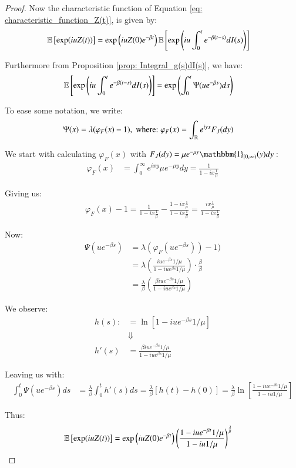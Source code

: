 \begin{proof}
Now the characteristic function of Equation \ref{eq: characteristic_function_Z(t)}, is given by: 
\begin{align*}
\mathbb{E}\left[
\exp(iu Z(t))
\right] 
&= 
\exp\left(
iuZ(0)e^{-\beta t}\right) 
\mathbb{E}\left[
\exp\left(iu\int_{0}^{t}e^{-\beta(t-s)}dI(s)\right)
\right]
\end{align*}

Furthermore from Proposition \ref{prop: Integral_g(s)dI(s)}, we have: 
\begin{align*}
\mathbb{E}\left[
\exp\left(iu\int_{0}^{t}e^{-\beta(t-s)}dI(s)\right)
\right] 
&= 
\exp\left(
\int_{0}^{t}\Psi(ue^{-\beta s})ds
\right)
\end{align*}

To ease some notation, we write:
\begin{align*}
\Psi(x) &= \lambda(\varphi_{F}(x) - 1), \;\text{where:}\; 
\varphi_{F}(x) = \int_{\mathbb{R}}e^{iyx}F_{J}(dy) 
\end{align*}

We start with calculating $\varphi_{F}(x)$ with $F_{J}(dy) = 
\mu e^{-\mu y}\mathbbm{1}_{[0,\infty)}(y)dy:$ 
\begin{align*}
\varphi_{F}(x) &= 
\int_{0}^{\infty}e^{ixy}\mu e^{-\mu y}dy   
= \frac{1}{1-ix\frac{1}{\mu}}
\end{align*}

Giving us:
\begin{align*}
\varphi_{F}(x) - 1
= 
\frac{1}{1-ix\frac{1}{\mu}} - \frac{1-ix\frac{1}{\mu}}{1-ix\frac{1}{\mu}} 
= 
\frac{ix\frac{1}{\mu}}{1-ix\frac{1}{\mu}}
\end{align*}

Now: 
\begin{align*}
\Psi(ue^{-\beta s}) &= \lambda(\varphi_{F}(ue^{-\beta s})) -1) \\ 
&= \lambda\left(
\frac{iue^{-\beta s}1/\mu}{1-iue^{\beta s}1/\mu}
\right)\cdot \frac{\beta}{\beta} \\ 
&= 
\frac{\lambda}{\beta}\left(
\frac{\beta iue^{-\beta s}1/\mu}{1-iue^{\beta s}1/\mu}
\right)
\end{align*}

We observe: 
\begin{align*}
h(s) :&= \ln[1-iue^{-\beta s}1/\mu] \\ 
&\Downarrow \\ 
h'(s) &= \frac{\beta iue^{-\beta s}1/\mu}{1-iue^{\beta s}1/\mu} 
\end{align*}

Leaving us with: 
\begin{align*}
\int_{0}^{t}\Psi(ue^{-\beta s})ds
&= 
\frac{\lambda}{\beta}\int_{0}^{t}h'(s)ds
= 
\frac{\lambda}{\beta}[h(t)-h(0)] 
= 
\frac{\lambda}{\beta}
\ln\left[
\frac{1-iue^{-\beta t}1/\mu}{1-iu1/\mu}
\right]
\end{align*}

Thus:
\begin{align*}
\mathbb{E}\left[
\exp(iu Z(t))
\right] 
&= 
\exp\left(
iuZ(0)e^{-\beta t}\right)
\left(
\frac{
1-iue^{-\beta t}1/\mu}
{
1-iu1/\mu
}
\right)^{\frac{\lambda}{\beta}}
\end{align*}
\end{proof}

